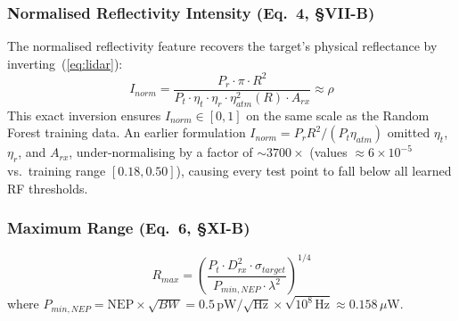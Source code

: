 \documentclass[12pt,a4paper]{article}
\begin{document}
\subsubsection{Normalised Reflectivity Intensity (Eq.~4, \S VII-B)}
\label{sec:inorm}
The normalised reflectivity feature recovers the target's physical reflectance by
inverting~(\ref{eq:lidar}):
\begin{equation}
    I_{norm} = \frac{P_r \cdot \pi \cdot R^2}
               {P_t \cdot \eta_t \cdot \eta_r \cdot \eta_{atm}^2(R) \cdot A_{rx}}
               \approx \rho
    \label{eq:inorm}
\end{equation}
This exact inversion ensures $I_{norm}\in[0,1]$ on the same scale as the Random Forest
training data.  An earlier formulation $I_{norm} = P_r R^2 / (P_t \eta_{atm})$ omitted
$\eta_t$, $\eta_r$, and $A_{rx}$, under-normalising by a factor of
$\sim\!3700\times$ (values $\approx6\times10^{-5}$ vs.\ training range $[0.18,0.50]$),
causing every test point to fall below all learned RF thresholds.

\subsubsection{Maximum Range (Eq.~6, \S XI-B)}
\begin{equation}
    R_{max} = \left(\frac{P_t \cdot D_{rx}^2 \cdot \sigma_{target}}
                         {P_{min,NEP} \cdot \lambda^2}\right)^{1/4}
    \label{eq:rmax}
\end{equation}
where $P_{min,NEP} = \mathrm{NEP}\times\sqrt{BW} = 0.5\,\mathrm{pW}/\sqrt{\mathrm{Hz}}
\times\sqrt{10^8\,\mathrm{Hz}} \approx 0.158\,\mu$W.
\end{document}
